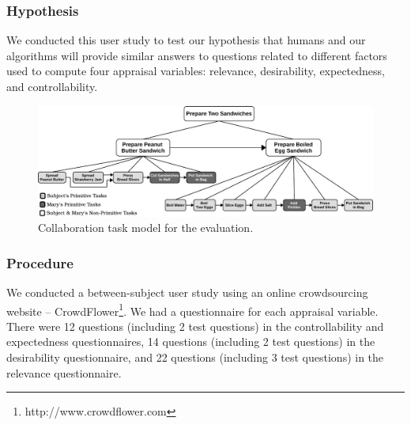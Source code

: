 \documentclass[12pt]{report}
\begin{document}
\subsubsection{Hypothesis}
We conducted this user study to test our hypothesis that humans and our
algorithms will provide similar answers to questions related to different
factors used to compute four appraisal variables: relevance, desirability,
expectedness, and controllability.

\begin{figure}[t]
  \centering
  \includegraphics[width=1\textwidth]{figure/taskModel-croped.pdf}
  \caption{Collaboration task model for the evaluation.}
  \label{fig:taskModel}
\end{figure}

\subsubsection{Procedure}
 We conducted a between-subject user study using an online crowdsourcing website
 -- CrowdFlower\footnote{http://www.crowdflower.com}. We had a questionnaire for
 each appraisal variable. There were 12 questions (including 2 test questions)
 in the controllability and expectedness questionnaires, 14 questions (including
 2 test questions) in the desirability questionnaire, and 22 questions
 (including 3 test questions) in the relevance questionnaire.
 
\end{document}
